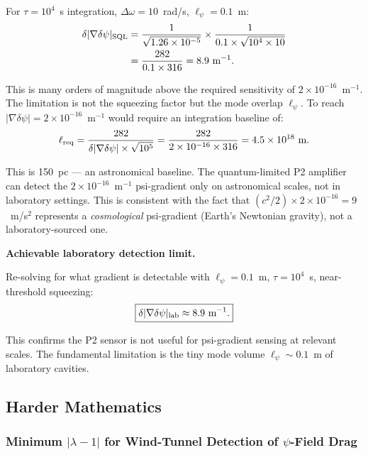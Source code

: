 \documentclass[11pt,twocolumn]{article}
\newcommand{\dpsi}{\delta\psi}
\newcommand{\lam}{\lambda}
\begin{document}
For $\tau = 10^4$~s integration, $\Delta\omega = 10$~rad/s, $\ell_\psi = 0.1$~m:
\begin{align}
\delta|\nabla\dpsi|_{\rm SQL} &= \frac{1}{\sqrt{1.26\times10^{-5}}}
\times\frac{1}{0.1\times\sqrt{10^4\times10}}
\nonumber\\
&= \frac{282}{0.1\times316}
= 8.9~\text{m}^{-1}.
\end{align}

This is many orders of magnitude above the required sensitivity of
$2\times10^{-16}$~m$^{-1}$. The limitation is not the squeezing factor
but the mode overlap $\ell_\psi$. To reach $|\nabla\dpsi| = 2\times10^{-16}$~m$^{-1}$
would require an integration baseline of:
\begin{equation}
\ell_{\rm req} = \frac{282}{\delta|\nabla\dpsi|\times\sqrt{10^5}}
= \frac{282}{2\times10^{-16}\times316}
= 4.5\times10^{18}~\text{m}.
\label{eq:ell_req}
\end{equation}

This is 150~pc --- an astronomical baseline. The quantum-limited P2 amplifier
can detect the $2\times10^{-16}$~m$^{-1}$ psi-gradient only on astronomical scales,
not in laboratory settings. This is consistent with the fact that
$(c^2/2)\times2\times10^{-16} = 9$~m/s$^2$ represents a \emph{cosmological}
psi-gradient (Earth's Newtonian gravity), not a laboratory-sourced one.

\textbf{Achievable laboratory detection limit.}

Re-solving for what gradient is detectable with $\ell_\psi = 0.1$~m,
$\tau = 10^4$~s, near-threshold squeezing:
\begin{equation}
\boxed{
\delta|\nabla\dpsi|_{\rm lab} \approx 8.9~\text{m}^{-1}.
}
\label{eq:lab_limit}
\end{equation}

This confirms the P2 sensor is not useful for psi-gradient sensing at
relevant scales. The fundamental limitation is the tiny mode volume
$\ell_\psi \sim 0.1$~m of laboratory cavities.

\subsection{Harder Mathematics}
\label{sec:math}

\subsubsection{Minimum $|\lam-1|$ for Wind-Tunnel Detection of
  $\psi$-Field Drag}
\label{sec:lambda_windtunnel}
\end{document}
